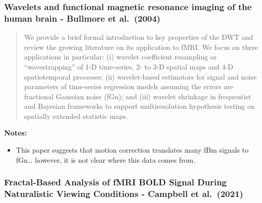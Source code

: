 \documentclass[
  sn-vancouver,
  Numbered,
  referee,
  lineno]{sn-jnl}
\providecommand{\tightlist}{%
  \setlength{\itemsep}{0pt}\setlength{\parskip}{0pt}}\usepackage{longtable,booktabs,array}
\begin{document}
\subsubsection{\texorpdfstring{Wavelets and functional magnetic
resonance imaging of the human brain - Bullmore et al.~(2004)
\citep{bullmoreWaveletsFunctionalMagnetic2004}}{Wavelets and functional magnetic resonance imaging of the human brain - Bullmore et al.~(2004) {[}@bullmoreWaveletsFunctionalMagnetic2004{]}}}\label{wavelets-and-functional-magnetic-resonance-imaging-of-the-human-brain---bullmore-et-al.-2004-bullmorewaveletsfunctionalmagnetic2004-1}

\begin{quote}
We provide a brief formal introduction to key properties of the DWT and
review the growing literature on its application to fMRI. We focus on
three applications in particular: (i) wavelet coefficient resampling or
``wavestrapping'' of 1-D time-series, 2- to 3-D spatial maps and 4-D
spatiotemporal processes; (ii) wavelet-based estimators for signal and
noise parameters of time-series regression models assuming the errors
are fractional Gaussian noise (fGn); and (iii) wavelet shrinkage in
frequentist and Bayesian frameworks to support multiresolution
hypothesis testing on spatially extended statistic maps.
\end{quote}

\textbf{Notes:}

\begin{itemize}
\tightlist
\item
  This paper suggests that motion correction translates many fBm signals
  to fGn\ldots{} however, it is not clear where this data comes from.
\end{itemize}

\subsubsection{\texorpdfstring{Fractal-Based Analysis of fMRI BOLD
Signal During Naturalistic Viewing Conditions - Campbell et al.~(2021)
\citep{campbellFractalBasedAnalysisFMRI2022}}{Fractal-Based Analysis of fMRI BOLD Signal During Naturalistic Viewing Conditions - Campbell et al.~(2021) {[}@campbellFractalBasedAnalysisFMRI2022{]}}}\label{fractal-based-analysis-of-fmri-bold-signal-during-naturalistic-viewing-conditions---campbell-et-al.-2021-campbellfractalbasedanalysisfmri2022-1}
\end{document}
